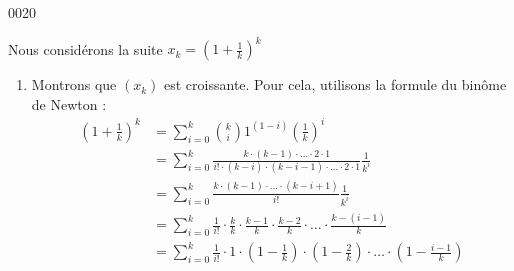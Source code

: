 
\begin{corrige}{0020}

Nous considérons la suite $x_k = {\left(1+\frac1k\right)}^k$
\begin{enumerate}
\item Montrons que $(x_k)$ est croissante. Pour cela, utilisons la
  formule du binôme de Newton :
  \begin{equation*}
    \begin{split}
      {\left(1+\frac1{k}\right)}^{k} &= \sum_{i=0}^{k} \binom{k}{i}
      1^{(1-i)} {\left(\frac{1}{k}\right)}^i\\
      &= \sum_{i=0}^{k} \frac{k\cdot (k-1)\cdot\ldots\cdot 2 \cdot 1
      }{i! \cdot
        (k-i)\cdot(k-i-1)\cdot\ldots\cdot 2\cdot 1} \frac{1}{k^i}\\
      &= \sum_{i=0}^{k} \frac{k\cdot(k-1)\cdot\ldots\cdot(k - i +
        1)}{i!}
      \frac{1}{k^i}\\
      &=\sum_{i=0}^{k} \frac{1}{i!} \cdot \frac{k}{k}\cdot
      \frac{k-1}{k}\cdot\frac{k-2}{k}\cdot\ldots\cdot
      \frac{k-(i-1)}{k}\\
      &=\sum_{i=0}^{k} \frac{1}{i!} \cdot 1\cdot \left(1 - \frac{1}{k}\right)\cdot\left(1 - \frac{2}{k}\right)\cdot\ldots\cdot\left(1 - \frac{i-1}{k}\right)\\
%

\end{split}
\end{equation*}
\end{enumerate}
\end{corrige}
